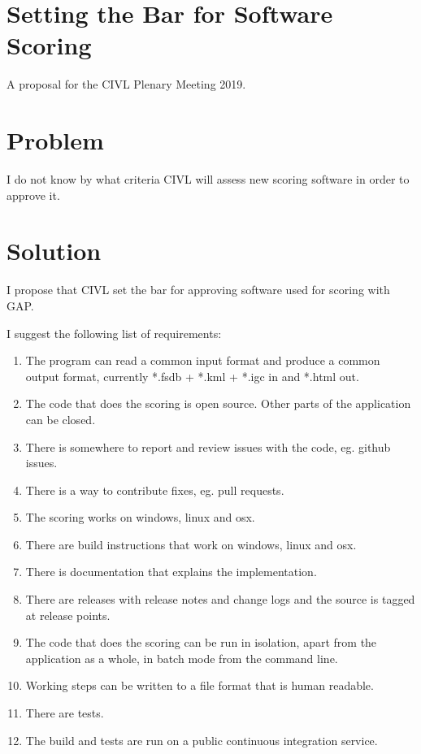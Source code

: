 \documentclass{article}
\begin{document}
\section*{Setting the Bar for Software Scoring}

A proposal for the CIVL Plenary Meeting 2019.

\section*{Problem}
I do not know by what criteria CIVL will assess new scoring software in order
to approve it.

\section*{Solution}
I propose that CIVL set the bar for approving software used for scoring with
GAP.

I suggest the following list of requirements:\\
\begin{enumerate}
    \item The program can read a common input format and produce a common
    output format, currently *.fsdb + *.kml + *.igc in and *.html out.
    \item The code that does the scoring is open source. Other parts of the
    application can be closed.
    \item There is somewhere to report and review issues with the code, eg.
    github issues.
    \item There is a way to contribute fixes, eg. pull requests.
    \item The scoring works on windows, linux and osx.
    \item There are build instructions that work on windows, linux and osx.
    \item There is documentation that explains the implementation.
    \item There are releases with release notes and change logs and the source
    is tagged at release points.
    \item The code that does the scoring can be run in isolation, apart from
    the application as a whole, in batch mode from the command line.
    \item Working steps can be written to a file format that is human readable.
    \item There are tests.
    \item The build and tests are run on a public continuous integration service.
\end{enumerate}
\end{document}
